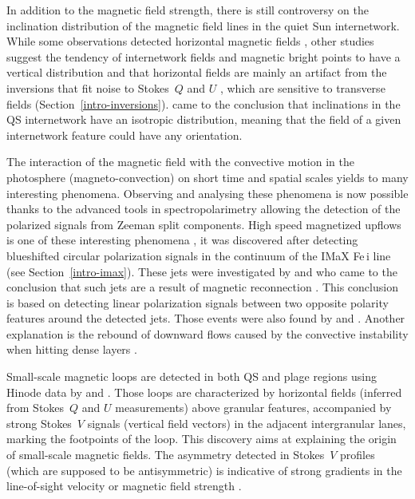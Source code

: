 \documentclass[goettingen, gauss, print]{thesis}
\begin{document}
In addition to the magnetic field strength, there is still controversy on the inclination distribution of the magnetic field lines in the quiet Sun internetwork. While some observations detected horizontal magnetic fields \citep{orozco_suarez_strategy_2007,lites_horizontal_2008}, other studies suggest the tendency of internetwork fields and magnetic bright points to have a vertical distribution \citep{stenflo_distribution_2010, jafarzadeh_inclinations_2014} and that horizontal fields are mainly an artifact from the inversions that fit noise to Stokes~$Q$ and $U$ \citep{borrero_inferring_2011}, which are sensitive to transverse fields (Section~\ref{intro-inversions}). \cite{asensio_ramos_evidence_2009} came to the conclusion that inclinations in the QS internetwork have an isotropic distribution, meaning that the field of a given internetwork feature could have any orientation.

The interaction of the magnetic field with the convective motion in the photosphere (magneto-convection) on short time and spatial scales yields to many interesting phenomena. Observing and analysing these phenomena is now possible thanks to the advanced tools in spectropolarimetry allowing the detection of the polarized signals from Zeeman split components. High speed magnetized upflows is one of these interesting phenomena \citep{borrero_supersonic_2010}, it was discovered after detecting blueshifted circular polarization signals in the continuum of the IMaX Fe\,{\sc i} line (see Section~\ref{intro-imax}). These jets were investigated by \cite{borrero_is_2013} and \cite{quintero_noda_high_2014} who came to the conclusion that such jets are a result of magnetic reconnection \citep{parker_kinematical_1963}. This conclusion is based on detecting linear polarization signals between two opposite polarity features around the detected jets. Those events were also found by \cite{rubio_da_costa_centre--limb_2015} and \cite{martinez_pillet_ubiquitous_2011}. Another explanation is the rebound of downward flows caused by the convective instability when hitting dense layers \citep{grossmann-doerth_convective_1998,requerey_history_2014}.

Small-scale magnetic loops are detected in both QS and plage regions using Hinode data by \cite{centeno_emergence_2007} and \cite{ishikawa_comparison_2009}. Those loops are characterized by horizontal fields (inferred from Stokes~$Q$ and $U$ measurements) above granular features, accompanied by strong Stokes~$V$ signals (vertical field vectors) in the adjacent intergranular lanes, marking the footpoints of the loop. This discovery aims at explaining the origin of small-scale magnetic fields. The asymmetry detected in Stokes~$V$ profiles (which are supposed to be antisymmetric) is indicative of strong gradients in the line-of-sight velocity or magnetic field strength \citep{illing_broad-band_1975,grossmann-doerth_unshifted_1988, quintero_noda_photospheric_2014}.
\end{document}
